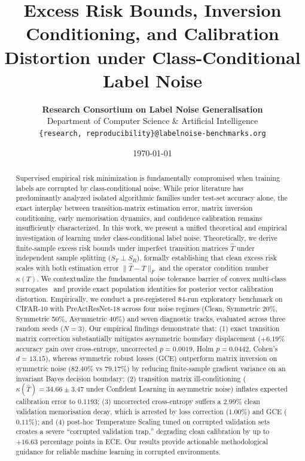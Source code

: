 \documentclass[10pt,twocolumn]{article}
\title{\textbf{Excess Risk Bounds, Inversion Conditioning, and Calibration Distortion under Class-Conditional Label Noise}}
\author{
  \textbf{Research Consortium on Label Noise Generalisation} \\
  Department of Computer Science \& Artificial Intelligence \\
  \texttt{\{research, reproducibility\}@labelnoise-benchmarks.org}
}
\date{\today}
\theoremstyle{definition}
\begin{document}
\maketitle

\begin{abstract}
Supervised empirical risk minimization is fundamentally compromised when training labels are corrupted by class-conditional noise. While prior literature has predominantly analyzed isolated algorithmic families under test-set accuracy alone, the exact interplay between transition-matrix estimation error, matrix inversion conditioning, early memorisation dynamics, and confidence calibration remains insufficiently characterized. In this work, we present a unified theoretical and empirical investigation of learning under class-conditional label noise. Theoretically, we derive finite-sample excess risk bounds under imperfect transition matrices $\hat{T}$ under independent sample splitting ($S_T \perp S_R$), formally establishing that clean excess risk scales with both estimation error $\|\hat{T} - T\|_F$ and the operator condition number $\kappa(T)$. We contextualize the fundamental noise tolerance barrier of convex multi-class surrogates~\cite{charoenphakdee2019symmetric} and provide exact population identities for posterior vector calibration distortion. Empirically, we conduct a pre-registered 84-run exploratory benchmark on CIFAR-10 with PreActResNet-18 across four noise regimes (Clean, Symmetric 20\%, Symmetric 50\%, Asymmetric 40\%) and seven diagnostic tracks, evaluated across three random seeds ($N=3$). Our empirical findings demonstrate that: (1) exact transition matrix correction substantially mitigates asymmetric boundary displacement ($+6.19\%$ accuracy gain over cross-entropy, uncorrected $p = 0.0019$, Holm $p = 0.0442$, Cohen's $d = 13.15$), whereas symmetric robust losses (GCE) outperform matrix inversion on symmetric noise ($82.40\%$ vs $79.17\%$) by reducing finite-sample gradient variance on an invariant Bayes decision boundary; (2) transition matrix ill-conditioning ($\kappa(\hat{T}) = 34.66 \pm 3.47$ under Confident Learning in asymmetric noise) inflates expected calibration error to $0.1193$; (3) uncorrected cross-entropy suffers a $2.99\%$ clean validation memorisation decay, which is arrested by loss correction ($1.00\%$) and GCE ($0.11\%$); and (4) post-hoc Temperature Scaling tuned on corrupted validation sets creates a severe ``corrupted validation trap,'' degrading clean calibration by up to $+16.63$ percentage points in ECE. Our results provide actionable methodological guidance for reliable machine learning in corrupted environments.
\end{abstract}
\end{document}
